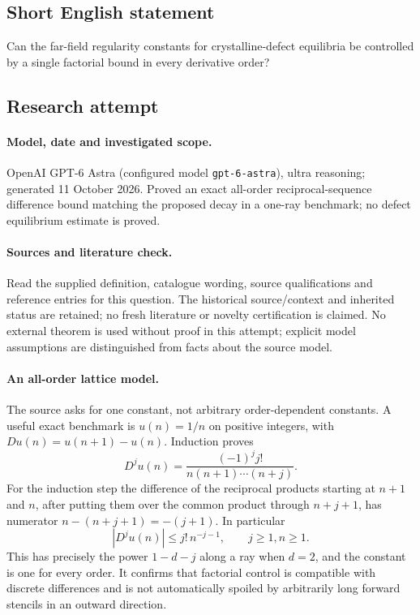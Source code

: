 \documentclass[11pt]{article}
\begin{document}
\subsection{Short English statement}
Can the far-field regularity constants for crystalline-defect equilibria be controlled by a single factorial bound in every derivative order?
\subsection{Research attempt}
\paragraph{Model, date and investigated scope.}
OpenAI GPT-6 Astra (configured model \texttt{gpt-6-astra}), ultra reasoning; generated 11 October 2026. Proved an exact all-order reciprocal-sequence difference bound matching the proposed decay in a one-ray benchmark; no defect equilibrium estimate is proved.

\paragraph{Sources and literature check.}
Read the supplied definition, catalogue wording, source qualifications and reference entries for this question. The historical source/context and inherited status are retained; no fresh literature or novelty certification is claimed. No external theorem is used without proof in this attempt; explicit model assumptions are distinguished from facts about the source model.

\paragraph{An all-order lattice model.} The source asks for one constant, not arbitrary order-dependent constants. A useful exact benchmark is \(u(n)=1/n\) on positive integers, with \(Du(n)=u(n+1)-u(n)\). Induction proves
\[
 D^ju(n)=\frac{(-1)^jj!}{n(n+1)\cdots(n+j)}.
\]
For the induction step the difference of the reciprocal products starting at \(n+1\) and \(n\), after putting them over the common product through \(n+j+1\), has numerator \(n-(n+j+1)=-(j+1)\). In particular
\[
 |D^ju(n)|\le j!\,n^{-j-1},\qquad j\ge1,n\ge1.
\]
This has precisely the power \(1-d-j\) along a ray when \(d=2\), and the constant is one for every order. It confirms that factorial control is compatible with discrete differences and is not automatically spoiled by arbitrarily long forward stencils in an outward direction.
\end{document}
